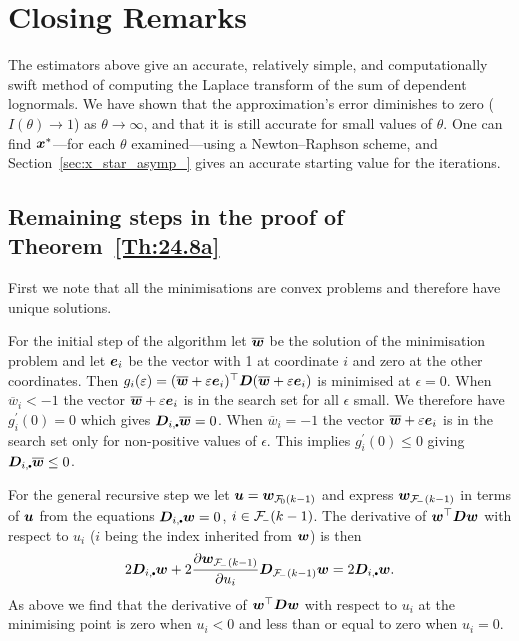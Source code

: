 \section{Closing Remarks}\label{S:Remarks}

The estimators above give an accurate, relatively simple, and computationally
swift method of computing the Laplace transform of the sum of dependent
lognormals. We have shown that the approximation's error diminishes to zero
($I(\theta) \to 1$) as $\theta \to \infty$, and that it is still accurate for
small values of $\theta$. One can find $\bm{x}^*$---for each $\theta$
examined---using a Newton--Raphson scheme, and Section~\ref{sec:x_star_asymp_}
gives an accurate starting value for the iterations.

\begin{subappendices}

\section{Remaining steps in the proof of Theorem~\ref{Th:24.8a}}

First we note that all the minimisations are convex problems and therefore
have unique solutions.

For the initial step of the algorithm let $\overline {\bm{w}}$ be the solution of
the minimisation problem and let $\bm{e}_i$ be the vector with 1 at coordinate
$i$ and zero at the other coordinates. Then $g_i(\varepsilon)=(\overline
{\bm{w}}+\varepsilon \bm{e}_i)^\top\bm{D}(\overline {\bm{w}}+\varepsilon \bm{e}_i)$ is minimised at
$\epsilon=0$. When $\overline w_i<-1$ the vector $\overline {\bm{w}}+\varepsilon
\bm{e}_i$ is in the search set for all $\epsilon$ small. We therefore have
$g_i^\prime(0)=0$ which gives $\bfD_{i,\sbullet}\overline \bfw=0$.  When
$\overline w_i=-1$ the vector $\overline {\bm{w}}+\varepsilon \bm{e}_i$ is in the
search set only for non-positive values of $\epsilon$.  This implies
$g_i^\prime(0)\leq 0$ giving $\bfD_{i,\sbullet}\overline \bfw\leq 0$.

For the general recursive step we let $\bfu=\bfw_{\Fset{0}(k-1)}$ and express
$\bfw_{\Fset{-}(k-1)}$ in terms of $\bm{u}$ from the equations
$\bfD_{i,\sbullet}\bfw=0$, $i\in \Fset{-}(k-1)$. The derivative of $\bm{w}^\top
\bm{D} \bm{w}$ with respect to $u_i$ ($i$ being the index inherited from $\bm{w}$)
is then
%
$$2\bfD_{i,\sbullet}\bfw+2\frac{\partial \bfw_{\Fset{-}(k-1)}}{\partial
u_i}\bfD_{\Fset{-}(k-1)}\bfw= 2\bfD_{i,\sbullet}\bfw.$$
%
As above we find that the derivative of $\bm{w}^\top \bm{D} \bm{w}$ with respect to
$u_i$ at the minimising point is zero when $u_i<0$ and less than or equal to
zero when $u_i=0$.


\end{subappendices}
